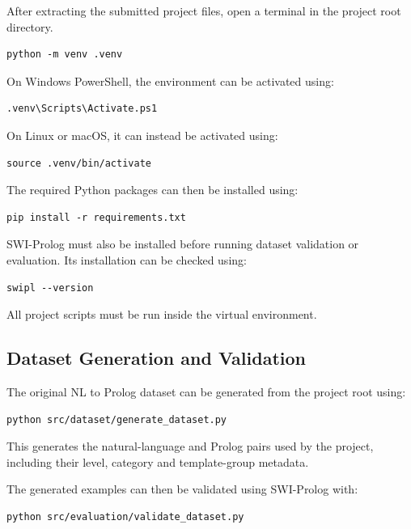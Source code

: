 \documentclass[11pt]{article} %
\theoremstyle{plain}
\theoremstyle{definition}
\begin{document}
After extracting the submitted project files, open a terminal in the project
root directory.

\begin{lstlisting}
python -m venv .venv
\end{lstlisting}

On Windows PowerShell, the environment can be activated using:

\begin{lstlisting}
.venv\Scripts\Activate.ps1
\end{lstlisting}

On Linux or macOS, it can instead be activated using:

\begin{lstlisting}
source .venv/bin/activate
\end{lstlisting}

The required Python packages can then be installed using:

\begin{lstlisting}
pip install -r requirements.txt
\end{lstlisting}

SWI-Prolog must also be installed before running dataset validation or
evaluation. Its installation can be checked using:

\begin{lstlisting}
swipl --version
\end{lstlisting}

All project scripts must be run inside the virtual environment.

\subsection{Dataset Generation and Validation}

The original NL to Prolog dataset can be generated from the project root using:

\begin{lstlisting}
python src/dataset/generate_dataset.py
\end{lstlisting}

This generates the natural-language and Prolog pairs used by the project,
including their level, category and template-group metadata.

The generated examples can then be validated using SWI-Prolog with:

\begin{lstlisting}
python src/evaluation/validate_dataset.py
\end{lstlisting}
\end{document}
